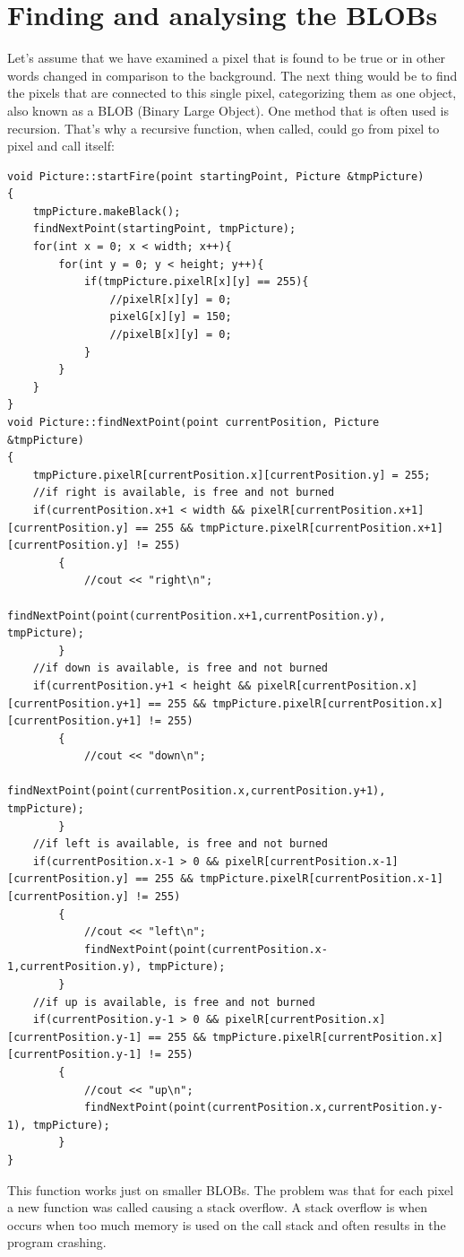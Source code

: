 \section{Finding and analysing the BLOBs}
Let's assume that we have examined a pixel that is found to be true or in other words changed in comparison to the background. The next thing would be to find the pixels that are connected to this single pixel, categorizing them as one object, also known as a BLOB (Binary Large Object). One method that is often used is recursion. That's why a recursive function, when called, could go from pixel to pixel and call itself:
\begin{lstlisting}
void Picture::startFire(point startingPoint, Picture &tmpPicture)
{
	tmpPicture.makeBlack();
	findNextPoint(startingPoint, tmpPicture);
	for(int x = 0; x < width; x++){
		for(int y = 0; y < height; y++){
			if(tmpPicture.pixelR[x][y] == 255){ 
				//pixelR[x][y] = 0;
				pixelG[x][y] = 150;
				//pixelB[x][y] = 0;
			}
		}
	}
}
void Picture::findNextPoint(point currentPosition, Picture &tmpPicture)
{
	tmpPicture.pixelR[currentPosition.x][currentPosition.y] = 255;
	//if right is available, is free and not burned
	if(currentPosition.x+1 < width && pixelR[currentPosition.x+1][currentPosition.y] == 255 && tmpPicture.pixelR[currentPosition.x+1][currentPosition.y] != 255)
		{
			//cout << "right\n";
			findNextPoint(point(currentPosition.x+1,currentPosition.y), tmpPicture);
		}
	//if down is available, is free and not burned
	if(currentPosition.y+1 < height && pixelR[currentPosition.x][currentPosition.y+1] == 255 && tmpPicture.pixelR[currentPosition.x][currentPosition.y+1] != 255)
		{
			//cout << "down\n";
			findNextPoint(point(currentPosition.x,currentPosition.y+1), tmpPicture);
		}
	//if left is available, is free and not burned
	if(currentPosition.x-1 > 0 && pixelR[currentPosition.x-1][currentPosition.y] == 255 && tmpPicture.pixelR[currentPosition.x-1][currentPosition.y] != 255)
		{
			//cout << "left\n";
			findNextPoint(point(currentPosition.x-1,currentPosition.y), tmpPicture);
		}
	//if up is available, is free and not burned
	if(currentPosition.y-1 > 0 && pixelR[currentPosition.x][currentPosition.y-1] == 255 && tmpPicture.pixelR[currentPosition.x][currentPosition.y-1] != 255)
		{
			//cout << "up\n";
			findNextPoint(point(currentPosition.x,currentPosition.y-1), tmpPicture);
		}
}
\end{lstlisting}
This function works just on smaller BLOBs. The problem was that for each pixel a new function was called causing a stack overflow. A stack overflow is when occurs when too much memory is used on the call stack and often results in the program crashing.

